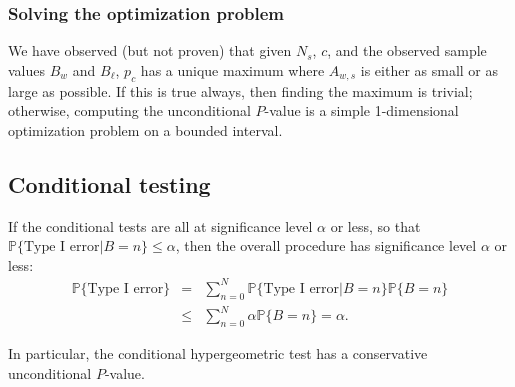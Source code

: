 \documentclass[runningheads]{llncs}
\begin{document}
\subsubsection{Solving the optimization problem}

We have observed (but not proven) that given $N_s$, $c$, and the observed sample values $B_w$ and $B_\ell$, $p_c$ has a unique maximum where $A_{w,s}$ is either as small or as large as possible.
If this is true always, then finding the maximum is trivial;
otherwise, computing the unconditional $P$-value is a simple 1-dimensional optimization problem
on a bounded interval.

\subsection{Conditional testing}
If the conditional tests are all at significance level $\alpha$ or less, so that
$\mathbb{P} \{\mbox{Type I error} | B = n\} \le \alpha$, then the
overall procedure has significance level $\alpha$ or less:
\begin{eqnarray}
    \mathbb{P} \{\mbox{Type I error}\} &=& \sum_{n=0}^N  \mathbb{P}\{\mbox{Type I error} |  B = n\} \mathbb{P} \{ B = n \} \nonumber \\
       & \le & \sum_{n=0}^N \alpha \mathbb{P} \{  B = n \}  =  \alpha.
\end{eqnarray}

In particular, the conditional hypergeometric test has a conservative unconditional $P$-value.





\end{document}
